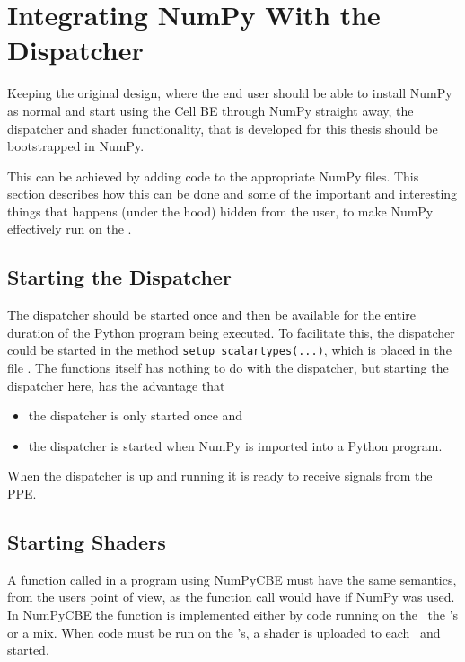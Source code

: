 \section{Integrating NumPy With the Dispatcher}


Keeping the original design, where the end user should be able to
install NumPy as normal and start using the Cell BE through NumPy
straight away, the dispatcher and shader functionality, that is
developed for this thesis should be bootstrapped in NumPy.

This can be achieved by adding code to the appropriate NumPy
files. This section describes how this can be done and some of the
important and interesting things that happens (under the hood) hidden
from the user, to make NumPy effectively run on the \CBE{}.

\subsection{Starting the Dispatcher}
The dispatcher should be started once and then be available for the
entire duration of the Python program being executed. To facilitate
this, the dispatcher could be started in the
method \linebreak[5] \texttt{setup\_scalartypes(...)}, which is placed in the
file . The functions itself has nothing to
do with the dispatcher, but starting the dispatcher here, has the
advantage that

\begin{itemize}
\item{the dispatcher is only started once and}
\item{the dispatcher is started when NumPy is imported into a Python program.}
\end{itemize}

When the dispatcher is up and running it is ready to receive signals from the PPE.

\subsection{Starting Shaders}
A function called in a program using NumPyCBE must have the same semantics,
from the users point of view, as the function call would have if NumPy was used.
In NumPyCBE the function is implemented either by code running on the \PPE\, the \SPE{}'s
or a mix. When code must be run on the \SPE{}'s, a shader is uploaded to each \SPE\ and
started.

